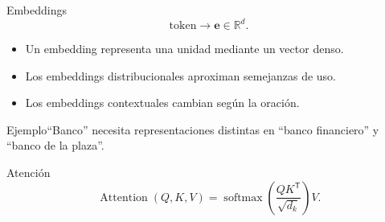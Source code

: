 \documentclass[aspectratio=169,10pt]{beamer}
\begin{document}
\begin{frame}{Embeddings}
  \[
    \text{token}\longrightarrow\mathbf{e}\in\mathbb{R}^{d}.
  \]
  \begin{itemize}
    \item Un embedding representa una unidad mediante un vector denso.
    \item Los embeddings distribucionales aproximan semejanzas de uso.
    \item Los embeddings contextuales cambian según la oración.
  \end{itemize}
  \begin{block}{Ejemplo}“Banco” necesita representaciones distintas en “banco financiero” y “banco de la plaza”.\end{block}
\end{frame}

\begin{frame}{Atención}
  \[
    \operatorname{Attention}(Q,K,V)=
    \operatorname{softmax}\left(\frac{QK^{\mathsf T}}{\sqrt{d_k}}\right)V.
  \]
  \begin{center}
  \end{center}
\end{frame}
\end{document}
